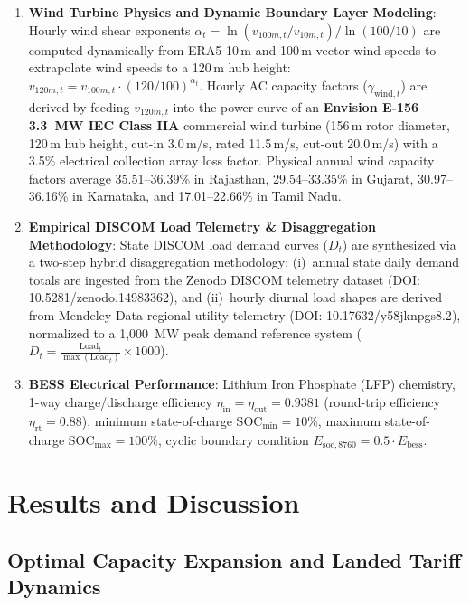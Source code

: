 \documentclass[11pt,a4paper]{article}
\begin{document}
\begin{enumerate}
    \item \textbf{Wind Turbine Physics and Dynamic Boundary Layer Modeling}: Hourly wind shear exponents $\alpha_t = \ln(v_{100m,t} / v_{10m,t}) / \ln(100 / 10)$ are computed dynamically from ERA5 10\,m and 100\,m vector wind speeds to extrapolate wind speeds to a 120\,m hub height: $v_{120m,t} = v_{100m,t} \cdot (120/100)^{\alpha_t}$. Hourly AC capacity factors ($\gamma_{\text{wind},t}$) are derived by feeding $v_{120m,t}$ into the power curve of an \textbf{Envision E-156 3.3~MW IEC Class IIA} commercial wind turbine (156\,m rotor diameter, 120\,m hub height, cut-in 3.0\,m/s, rated 11.5\,m/s, cut-out 20.0\,m/s) with a 3.5\% electrical collection array loss factor. Physical annual wind capacity factors average 35.51--36.39\% in Rajasthan, 29.54--33.35\% in Gujarat, 30.97--36.16\% in Karnataka, and 17.01--22.66\% in Tamil Nadu.

    \item \textbf{Empirical DISCOM Load Telemetry \& Disaggregation Methodology}: State DISCOM load demand curves ($D_t$) are synthesized via a two-step hybrid disaggregation methodology: (i)~annual state daily demand totals are ingested from the Zenodo DISCOM telemetry dataset (\textsf{DOI: 10.5281/zenodo.14983362}), and (ii)~hourly diurnal load shapes are derived from Mendeley Data regional utility telemetry (\textsf{DOI: 10.17632/y58jknpgs8.2}), normalized to a 1,000~MW peak demand reference system ($D_t = \frac{\text{Load}_t}{\max(\text{Load}_t)} \times 1000$).

    \item \textbf{BESS Electrical Performance}: Lithium Iron Phosphate (LFP) chemistry, 1-way charge/discharge efficiency $\eta_{\text{in}} = \eta_{\text{out}} = 0.9381$ (round-trip efficiency $\eta_{\text{rt}} = 0.88$), minimum state-of-charge $\text{SOC}_{\text{min}} = 10\%$, maximum state-of-charge $\text{SOC}_{\text{max}} = 100\%$, cyclic boundary condition $E_{\text{soc},8760} = 0.5 \cdot E_{\text{bess}}$.
\end{enumerate}

\section{Results and Discussion}
\label{sec:results}

\subsection{Optimal Capacity Expansion and Landed Tariff Dynamics}
\end{document}
